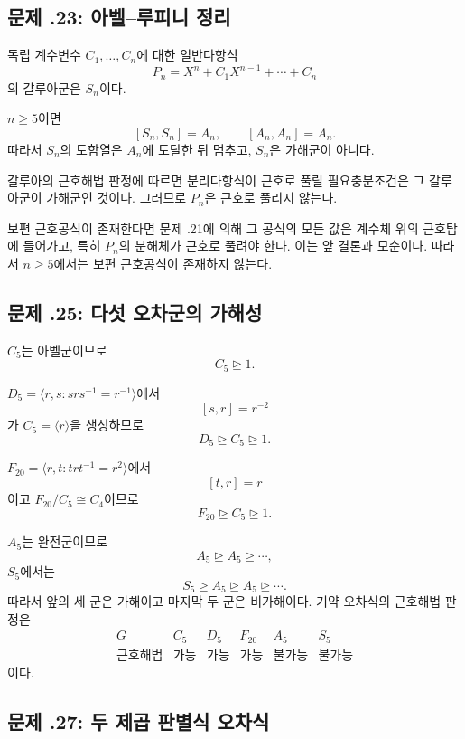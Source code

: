 \subsection*{문제 \thechapter.23: 아벨--루피니 정리}

\begin{solution}
독립 계수변수 $C_1,\dots,C_n$에 대한 일반다항식
\[
  P_n=X^n+C_1X^{n-1}+\cdots+C_n
\]
의 갈루아군은 $S_n$이다.

$n\ge5$이면
\[
  [S_n,S_n]=A_n,
  \qquad
  [A_n,A_n]=A_n.
\]
따라서 $S_n$의 도함열은 $A_n$에 도달한 뒤 멈추고, $S_n$은 가해군이 아니다.

갈루아의 근호해법 판정에 따르면 분리다항식이 근호로 풀릴 필요충분조건은 그 갈루아군이 가해군인 것이다. 그러므로 $P_n$은 근호로 풀리지 않는다.

보편 근호공식이 존재한다면 문제 \thechapter.21에 의해 그 공식의 모든 값은 계수체 위의 근호탑에 들어가고, 특히 $P_n$의 분해체가 근호로 풀려야 한다. 이는 앞 결론과 모순이다. 따라서 $n\ge5$에서는 보편 근호공식이 존재하지 않는다.
\end{solution}

\subsection*{문제 \thechapter.25: 다섯 오차군의 가해성}

\begin{solution}
$C_5$는 아벨군이므로
\[
  C_5\trianglerighteq1.
\]

$D_5=\langle r,s:srs^{-1}=r^{-1}\rangle$에서
\[
  [s,r]=r^{-2}
\]
가 $C_5=\langle r\rangle$을 생성하므로
\[
  D_5\trianglerighteq C_5\trianglerighteq1.
\]

$F_{20}=\langle r,t:trt^{-1}=r^2\rangle$에서
\[
  [t,r]=r
\]
이고 $F_{20}/C_5\cong C_4$이므로
\[
  F_{20}\trianglerighteq C_5\trianglerighteq1.
\]

$A_5$는 완전군이므로
\[
  A_5\trianglerighteq A_5\trianglerighteq\cdots,
\]
$S_5$에서는
\[
  S_5\trianglerighteq A_5\trianglerighteq A_5
  \trianglerighteq\cdots.
\]
따라서 앞의 세 군은 가해이고 마지막 두 군은 비가해이다. 기약 오차식의 근호해법 판정은
\[
\begin{array}{c|ccccc}
G&C_5&D_5&F_{20}&A_5&S_5\\
\hline
\text{근호해법}&\text{가능}&\text{가능}&\text{가능}&\text{불가능}&\text{불가능}
\end{array}
\]
이다.
\end{solution}

\subsection*{문제 \thechapter.27: 두 제곱 판별식 오차식}

